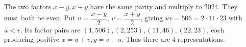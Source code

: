 The two factors $x-y,x+y$ have the same parity and multiply to $2024$. They must both be even. Put $u=\dfrac{x-y}{2}$, $v=\dfrac{x+y}{2}$, giving $uv=506=2\cdot11\cdot23$ with $u<v$. Its factor pairs are $(1,506),(2,253),(11,46),(22,23)$, each producing positive $x=u+v,y=v-u$. Thus there are $\boxed4$ representations.
